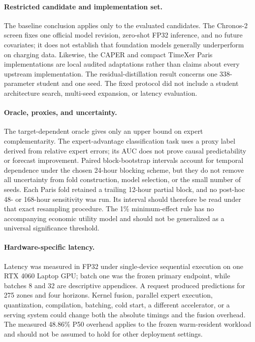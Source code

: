 \paragraph{Restricted candidate and implementation set.}
The baseline conclusion applies only to the evaluated candidates. The Chronos-2 screen fixes one official model revision, zero-shot FP32 inference, and no future covariates; it does not establish that foundation models generally underperform on charging data. Likewise, the CAPER and compact TimeXer Paris implementations are local audited adaptations rather than claims about every upstream implementation. The residual-distillation result concerns one 338-parameter student and one seed. The fixed protocol did not include a student architecture search, multi-seed expansion, or latency evaluation.

\paragraph{Oracle, proxies, and uncertainty.}
The target-dependent oracle gives only an upper bound on expert complementarity. The expert-advantage classification task uses a proxy label derived from relative expert errors; its AUC does not prove causal predictability or forecast improvement. Paired block-bootstrap intervals account for temporal dependence under the chosen 24-hour blocking scheme, but they do not remove all uncertainty from fold construction, model selection, or the small number of seeds. Each Paris fold retained a trailing 12-hour partial block, and no post-hoc 48- or 168-hour sensitivity was run. Its interval should therefore be read under that exact resampling procedure. The 1\% minimum-effect rule has no accompanying economic utility model and should not be generalized as a universal significance threshold.

\paragraph{Hardware-specific latency.}
Latency was measured in FP32 under single-device sequential execution on one RTX 4060 Laptop GPU; batch one was the frozen primary endpoint, while batches 8 and 32 are descriptive appendices. A request produced predictions for 275 zones and four horizons. Kernel fusion, parallel expert execution, quantization, compilation, batching, cold start, a different accelerator, or a serving system could change both the absolute timings and the fusion overhead. The measured 48.86\% P50 overhead applies to the frozen warm-resident workload and should not be assumed to hold for other deployment settings.

